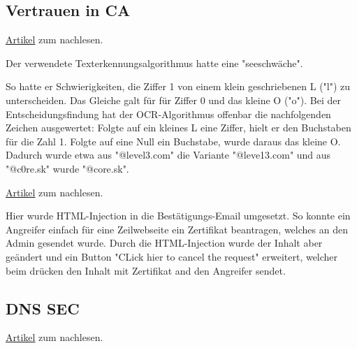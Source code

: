 \documentclass[a4paper]{article}
\begin{document}
\subsection{Vertrauen in CA}

\href{https://www.heise.de/news/Zertifikats-Klau-Fatale-Sehschwaeche-bei-Comodo-3354229.html}{Artikel} zum nachlesen.

Der verwendete Texterkennungsalgorithmus hatte eine "seeschwäche".

So hatte er Schwierigkeiten, die Ziffer 1 von einem klein geschriebenen L ("l") zu unterscheiden. Das Gleiche galt für für Ziffer 0 und das kleine O ("o"). Bei der Entscheidungsfindung hat der OCR-Algorithmus offenbar die nachfolgenden Zeichen ausgewertet: Folgte auf ein kleines L eine Ziffer, hielt er den Buchstaben für die Zahl 1. Folgte auf eine Null ein Buchstabe, wurde daraus das kleine O. Dadurch wurde etwa aus "@level3.com" die Variante "@leve13.com" und aus "@c0re.sk" wurde "@core.sk".

\href{https://www.heise.de/news/HTML-Injection-Luecke-erlaubte-Zertifikatsklau-bei-Comodo-3282183.html}{Artikel} zum nachlesen.

Hier wurde HTML-Injection in die Bestätigungs-Email umgesetzt. So konnte ein Angreifer einfach für eine Zeilwebseite ein Zertifikat beantragen, welches an den Admin gesendet wurde. Durch die HTML-Injection wurde der Inhalt aber geändert und ein Button "CLick hier to cancel the request" erweitert, welcher beim drücken den Inhalt mit Zertifikat and den Angreifer sendet.

\subsection{DNS SEC}

\href{https://www.cloudflare.com/de-de/learning/dns/dnssec/how-dnssec-works/}{Artikel} zum nachlesen.
\end{document}
